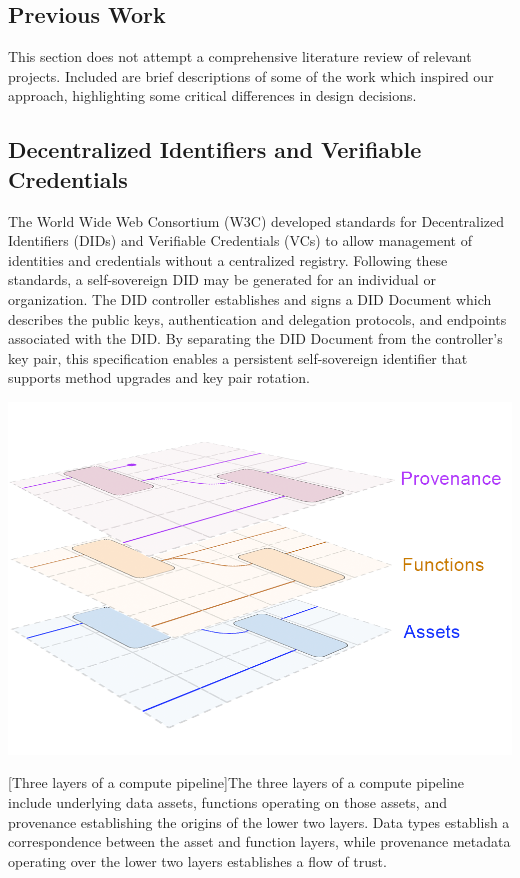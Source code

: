 \documentclass[9pt, oneside]{article}   	%
\begin{document}
\begin{multicols}{2}
\section{Previous Work}\label{PrevWork}

This section does not attempt a comprehensive literature review of relevant projects. Included are brief descriptions of some of the work which inspired our approach, highlighting some critical differences in design decisions.

\subsection{Decentralized Identifiers and Verifiable Credentials}\label{did-vc}

The World Wide Web Consortium (W3C) developed standards for Decentralized Identifiers (DIDs) and Verifiable Credentials (VCs) to allow management of identities and credentials without a centralized registry. Following these standards, a self-sovereign DID may be generated for an individual or organization. The DID controller establishes and signs a DID Document which describes the public keys, authentication and delegation protocols, and endpoints associated with the DID. By separating the DID Document from the controller's key pair, this specification enables a persistent self-sovereign identifier that supports method upgrades and key pair rotation. \cite{w3cDID}

\begin{center}
\includegraphics[width=1\columnwidth]{Fig1_assets_20230715}
\begin{flushright}
[Three layers of a compute pipeline]{The three layers of a compute pipeline include underlying data assets, functions operating on those assets, and provenance establishing the origins of the lower two layers. Data types establish a correspondence between the asset and function layers, while provenance metadata operating over the lower two layers establishes a flow of trust.}
\label{layeredDataFig1}
\end{flushright}
\end{center}


\end{multicols}
\end{document}
